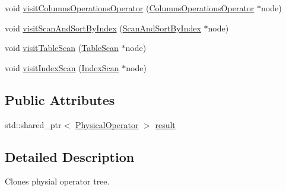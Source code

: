 \begin{DoxyCompactItemize}
\item 
void \hyperlink{class_cloning_physical_operator_visitor_ad818258fa87a049e49d255107f655819}{visit\+Columns\+Operations\+Operator} (\hyperlink{class_columns_operations_operator}{Columns\+Operations\+Operator} $\ast$node)
\item 
void \hyperlink{class_cloning_physical_operator_visitor_a5bead629c3b23b39316b8b86913617e7}{visit\+Scan\+And\+Sort\+By\+Index} (\hyperlink{class_scan_and_sort_by_index}{Scan\+And\+Sort\+By\+Index} $\ast$node)
\item 
void \hyperlink{class_cloning_physical_operator_visitor_aa7066c58c8963023737f1b8e0eca7bca}{visit\+Table\+Scan} (\hyperlink{class_table_scan}{Table\+Scan} $\ast$node)
\item 
void \hyperlink{class_cloning_physical_operator_visitor_ae5e119521bb2d4654eebba24bc469739}{visit\+Index\+Scan} (\hyperlink{class_index_scan}{Index\+Scan} $\ast$node)
\end{DoxyCompactItemize}
\subsection*{Public Attributes}
\begin{DoxyCompactItemize}
\item 
std\+::shared\+\_\+ptr$<$ \hyperlink{class_physical_operator}{Physical\+Operator} $>$ \hyperlink{class_cloning_physical_operator_visitor_aa3705b767976ef07fdfe39458543138e}{result}
\end{DoxyCompactItemize}


\subsection{Detailed Description}
Clones physial operator tree. 

